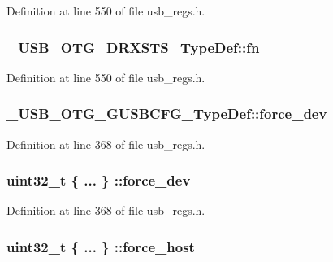 Definition at line 550 of file usb\-\_\-regs.\-h.

\hypertarget{group___u_s_b___o_t_g___d_r_i_v_e_r_gaa2fb877c0502a6b53de02b06aacafaa8}{
\subsubsection[{fn}]{ \-\_\-\-U\-S\-B\-\_\-\-O\-T\-G\-\_\-\-D\-R\-X\-S\-T\-S\-\_\-\-Type\-Def\-::fn}}\label{group___u_s_b___o_t_g___d_r_i_v_e_r_gaa2fb877c0502a6b53de02b06aacafaa8}


Definition at line 550 of file usb\-\_\-regs.\-h.

\hypertarget{group___u_s_b___o_t_g___d_r_i_v_e_r_ga5644ae82a540198fc40e0dce7fd1ca24}{
\subsubsection[{force\-\_\-dev}]{ \-\_\-\-U\-S\-B\-\_\-\-O\-T\-G\-\_\-\-G\-U\-S\-B\-C\-F\-G\-\_\-\-Type\-Def\-::force\-\_\-dev}}\label{group___u_s_b___o_t_g___d_r_i_v_e_r_ga5644ae82a540198fc40e0dce7fd1ca24}


Definition at line 368 of file usb\-\_\-regs.\-h.

\hypertarget{group___u_s_b___o_t_g___d_r_i_v_e_r_ga2db4114467940609c69d151f4fea336f}{
\subsubsection[{force\-\_\-dev}]{\setlength{\rightskip}{0pt plus 5cm}uint32\-\_\-t \{ ... \} \-::force\-\_\-dev}}\label{group___u_s_b___o_t_g___d_r_i_v_e_r_ga2db4114467940609c69d151f4fea336f}


Definition at line 368 of file usb\-\_\-regs.\-h.

\hypertarget{group___u_s_b___o_t_g___d_r_i_v_e_r_ga68ce2d2dcc58b678490b6ea8b23ec1bf}{
\subsubsection[{force\-\_\-host}]{\setlength{\rightskip}{0pt plus 5cm}uint32\-\_\-t \{ ... \} \-::force\-\_\-host}}\label{group___u_s_b___o_t_g___d_r_i_v_e_r_ga68ce2d2dcc58b678490b6ea8b23ec1bf}


